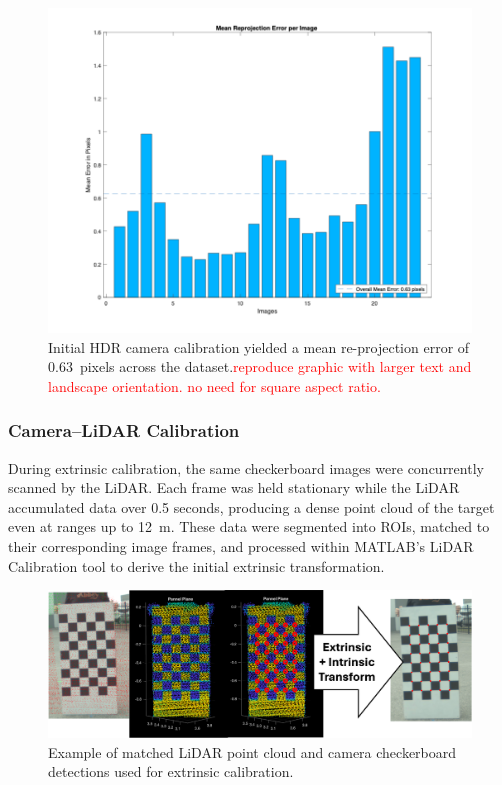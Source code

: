 \documentclass{erauthesis}
\begin{document}
\begin{figure}[htbp]
    \centering
    \includegraphics[width=0.9\linewidth]{Images/HDR_calib_error.png}
    \caption{Initial HDR camera calibration yielded a mean re-projection error of 0.63~pixels across the dataset.\textcolor{red}{reproduce graphic with larger text and landscape orientation. no need for square aspect ratio.}}
    \label{fig:HDR_calib_error}
\end{figure}

\subsubsection{Camera–LiDAR Calibration} \label{sec:camera-lidar_results}

During extrinsic calibration, the same checkerboard images were concurrently scanned by the LiDAR.  
Each frame was held stationary while the LiDAR accumulated data over 0.5 seconds, producing a dense point cloud of the target even at ranges up to 12~m.  
These data were segmented into \acp{ROI}, matched to their corresponding image frames, and processed within MATLAB’s LiDAR Calibration tool \cite{matlab_calibration} to derive the initial extrinsic transformation.

\begin{figure}[htbp]
    \centering
    \includegraphics[width=0.8\linewidth]{Images/calib_checkers.png}
    \caption{Example of matched LiDAR point cloud and camera checkerboard detections used for extrinsic calibration.}
    \label{fig:calib_check}
\end{figure}
\end{document}
